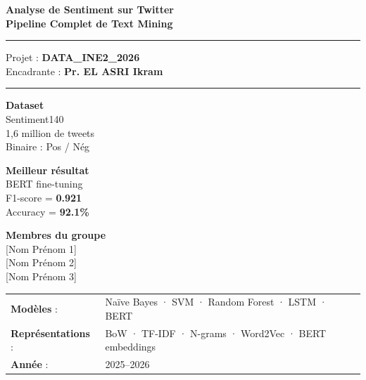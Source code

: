 \documentclass[12pt,a4paper]{article}
\begin{document}
\begin{titlepage}
\centering\vspace*{1cm}
{\LARGE\bfseries\color{primaryblue}
  Analyse de Sentiment sur Twitter\\[0.4em]
  \large Pipeline Complet de Text Mining}
\vspace{0.8cm}
\rule{\textwidth}{1pt}\vspace{0.3cm}

{\large Projet : \textbf{DATA\_INE2\_2026}}\\[0.2em]
{\normalsize Encadrante : \textbf{Pr. EL ASRI Ikram}}
\vspace{0.3cm}
\rule{\textwidth}{0.4pt}\vspace{1cm}

\begin{minipage}{0.48\textwidth}
\centering
\begin{tcolorbox}[colback=primaryblue!8,colframe=primaryblue]
\centering\small
\textbf{Dataset}\\[3pt]
Sentiment140\\1,6 million de tweets\\Binaire : Pos / Nég
\end{tcolorbox}
\end{minipage}\hfill
\begin{minipage}{0.48\textwidth}
\centering
\begin{tcolorbox}[colback=primarygreen!8,colframe=primarygreen]
\centering\small
\textbf{Meilleur résultat}\\[3pt]
BERT fine-tuning\\F1-score = \textbf{0.921}\\Accuracy = \textbf{92.1\%}
\end{tcolorbox}
\end{minipage}

\vspace{1cm}
\begin{tcolorbox}[colback=lightgray,colframe=darkgray!30,width=0.6\textwidth]
\centering
\textbf{Membres du groupe}\\[0.5em]
[Nom Prénom 1]\\[2pt][Nom Prénom 2]\\[2pt][Nom Prénom 3]
\end{tcolorbox}

\vspace{0.8cm}
\begin{tabular}{ll}
\textbf{Modèles} : & Naïve Bayes · SVM · Random Forest · LSTM · BERT\\[3pt]
\textbf{Représentations} : & BoW · TF-IDF · N-grams · Word2Vec · BERT embeddings\\[3pt]
\textbf{Année} : & 2025--2026
\end{tabular}
\end{titlepage}
\end{document}
